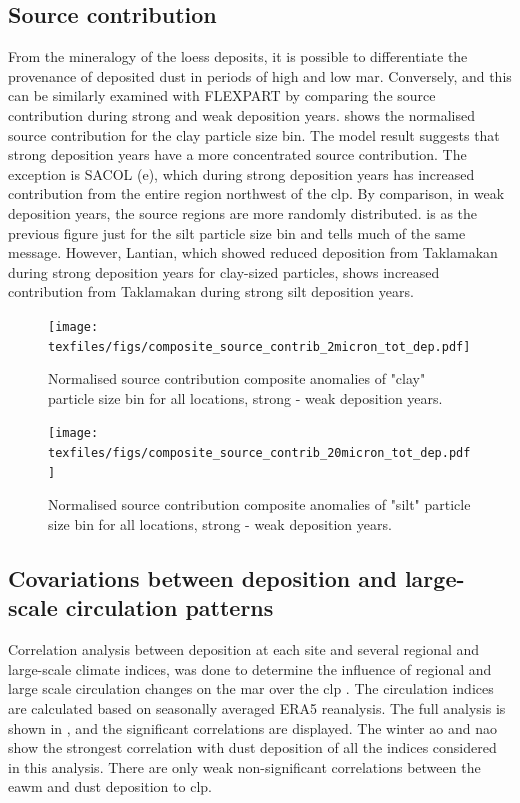 \subsection{Source contribution}
From the mineralogy of the loess deposits, it is possible to differentiate the provenance of deposited dust in periods of high and low \acrshort{mar}. Conversely, and this can be similarly examined with FLEXPART by comparing the source contribution during strong and weak deposition years.  
 shows the normalised source contribution for the clay particle size bin. The model result suggests that strong deposition years have a more concentrated source contribution. 
The exception is SACOL (e), which during strong deposition years has increased contribution from the entire region northwest of the \acrshort{clp}. 
By comparison, in weak deposition years, the source regions are more randomly distributed.  is as the previous figure just for the silt particle size bin and tells much of the same message. 
However, Lantian, which showed reduced deposition from Taklamakan during strong deposition years for clay-sized particles, shows increased contribution from Taklamakan during strong silt deposition years.     
\begin{figure}[hptb]
    \centering
    \texttt{[image: texfiles/figs/composite\_source\_contrib\_2micron\_tot\_dep.pdf]}
    \caption{Normalised source contribution composite anomalies of "clay" particle size bin for all locations, strong - weak deposition years.}
    \label{fig:source_contrib2mmu_anomalies}
\end{figure}

\begin{figure}[hptb]
    \centering
    \texttt{[image: texfiles/figs/composite\_source\_contrib\_20micron\_tot\_dep.pdf]}
    \caption{Normalised source contribution composite anomalies of "silt" particle size bin for all locations, strong - weak deposition years.}
    \label{fig:source_contrib20mmu_anomalies}
\end{figure}

\subsection{Covariations between deposition and large-scale circulation patterns}
Correlation analysis between deposition at each site and several regional and large-scale climate indices, was done to determine the influence of regional and large scale circulation changes on the \acrshort{mar} over the \acrshort{clp} .
The circulation indices are calculated based on seasonally averaged ERA5 reanalysis. 
The full analysis is shown in , and the significant correlations are displayed. 
The winter \acrshort{ao} and \acrshort{nao} show the strongest correlation with dust deposition of all the indices considered in this analysis. 
There are only weak non-significant correlations between the \acrshort{eawm} and dust deposition to \acrshort{clp}. 

